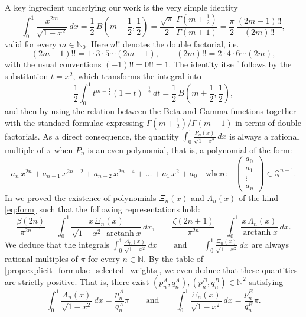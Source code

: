 \documentclass[11pt,twoside]{article}
\numberwithin{equation}{section}
\begin{document}
A key ingredient underlying our work is the very simple identity
\[
\int_0^1 \frac{x^{2m}}{\sqrt{1-x^2}}\,dx
= \frac{1}{2}\,B\!\left(m+\frac{1}{2},\frac{1}{2}\right)
= \frac{\sqrt{\pi}}{2}\,\frac{\Gamma\!\left(m+\tfrac{1}{2}\right)}{\Gamma(m+1)}
= \frac{\pi}{2}\,\frac{(2m-1)!!}{(2m)!!},
\]
valid for every $m\in\mathbb{N}_0$. Here $n!!$ denotes the double factorial, i.e.
\[
(2m-1)!! = 1\cdot 3\cdot 5\cdots (2m-1),\qquad
(2m)!! = 2\cdot 4\cdot 6\cdots (2m),
\]
with the usual conventions $(-1)!! = 0!! = 1$. The identity itself follows by the substitution $t=x^2$, which transforms the integral into
\[
\frac{1}{2}\int_0^1 t^{m-\frac12}(1-t)^{-\frac12}\,dt
= \frac{1}{2}\,B\!\left(m+\frac12,\frac12\right),
\]
and then by using the relation between the Beta and Gamma functions together with the standard formulae expressing $\Gamma(m+\tfrac12)/\Gamma(m+1)$ in terms of double factorials. As a direct consequence, the quantity $\displaystyle\int_0^1 \frac{P_n(x)}{\sqrt{1-x^2}}\,dx$ is always a rational multiple of $\pi$ when $P_n$ is an even polynomial, that is, a polynomial of the form:
\begin{equation}\label{eq:form}a_n\,x^{2n} + a_{n-1}\,x^{2n-2} + a_{n-2}\,x^{2n-4} + \ldots + a_1\,x^{2} + a_0 \quad \text{where} \quad \begin{pmatrix}
a_0\\
a_1\\
\vdots\\
a_n
\end{pmatrix}
 \in \mathbb{Q}^{n+1}.\end{equation} In \cite{TallaWaffo2025arxiv2511.02843} we proved the existence of polynomials $\Xi_n(x)$ and $\Lambda_n(x)$ of the kind \eqref{eq:form} such that the following representations hold:
\begin{equation}\label{eq:integral_definition}
\frac{\beta(2n)}{\pi^{2n-1}}=\int_0^1 \frac{x\,\Xi_n(x)}{\sqrt{1-x^2}\,\operatorname{arctanh}x}\,dx,
\qquad
\frac{\zeta(2n+1)}{\pi^{2n}}=\int_0^1 \frac{x\,\Lambda_n(x)}{\operatorname{arctanh}x}\,dx.
\end{equation}  We deduce that the integrals
\(\displaystyle
\int_0^1 \frac{\Lambda_n(x)}{\sqrt{1-x^2}}\,dx
\qquad\text{and}\qquad
\int_0^1 \frac{\Xi_n(x)}{\sqrt{1-x^2}}\,dx
\)
are always rational multiples of $\pi$ for every $n \in \mathbb{N}$. By the table of \cref{prop:explicit_formulae_selected_weights}, we even deduce that these quantities are strictly positive. That is, there exist $(p_n^{A}, q_n^{A}), (p_n^{B}, q_n^{B}) \in \mathbb{N}^{2}$ satisfying
\begin{equation}\label{eq:integral_pi_one}
\int_0^1 \frac{\Lambda_n(x)}{\sqrt{1-x^2}}\,dx = \frac{p_n^{A}}{q_n^{A}} \pi
\qquad\text{and}\qquad
\int_0^1 \frac{\Xi_n(x)}{\sqrt{1-x^2}}\,dx=\frac{p_n^{B}}{q_n^{B}}\pi.
\end{equation}
\end{document}
